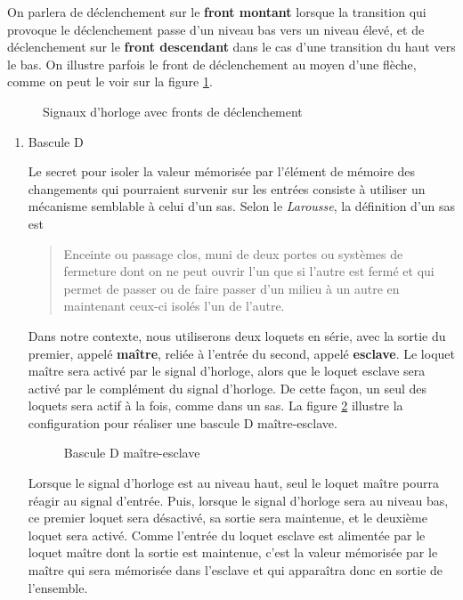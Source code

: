 \documentclass[letter, oneside]{book}
\begin{document}
On parlera de déclenchement sur le \textbf{front montant} lorsque la
transition qui provoque le déclenchement passe d'un niveau bas vers un
niveau élevé, et de déclenchement sur le \textbf{front descendant} dans le
cas d'une transition du haut vers le bas.  On illustre parfois le
front de déclenchement au moyen d'une flèche, comme on peut le voir
sur la figure \ref{fig:org79d1855}.

\begin{figure}[htbp]
\centering

\caption{\label{fig:org79d1855}Signaux d'horloge avec fronts de déclenchement}
\end{figure}

\begin{enumerate}
\item Bascule D
\label{sec:orgc5635c5}

Le secret pour isoler la valeur mémorisée par l'élément de mémoire des
changements qui pourraient survenir sur les entrées consiste à
utiliser un mécanisme semblable à celui d'un sas. Selon le \emph{Larousse}, la
définition d'un sas est

\begin{quote}
Enceinte ou passage clos, muni de deux portes ou systèmes de fermeture
dont on ne peut ouvrir l'un que si l'autre est fermé et qui permet de
passer ou de faire passer d'un milieu à un autre en maintenant ceux-ci
isolés l'un de l'autre.
\end{quote}

Dans notre contexte, nous utiliserons deux loquets en série, avec la
sortie du premier, appelé \textbf{maître}, reliée à l'entrée du second,
appelé \textbf{esclave}. Le loquet maître sera activé par le signal d'horloge,
alors que le loquet esclave sera activé par le complément du signal
d'horloge. De cette façon, un seul des loquets sera actif à la fois,
comme dans un sas. La figure \ref{fig:orgeadbe10} illustre la
configuration pour réaliser une bascule D maître-esclave.

\begin{figure}[htbp]
\centering

\caption{\label{fig:orgeadbe10}Bascule D maître-esclave}
\end{figure}

Lorsque le signal d'horloge est au niveau haut, seul le loquet maître
pourra réagir au signal d'entrée. Puis, lorsque le signal d'horloge
sera au niveau bas, ce premier loquet sera désactivé, sa sortie sera
maintenue, et le deuxième loquet sera activé. Comme l'entrée du loquet
esclave est alimentée par le loquet maître dont la sortie est
maintenue, c'est la valeur mémorisée par le maître qui sera mémorisée
dans l'esclave et qui apparaîtra donc en sortie de l'ensemble.


\end{enumerate}
\end{document}
